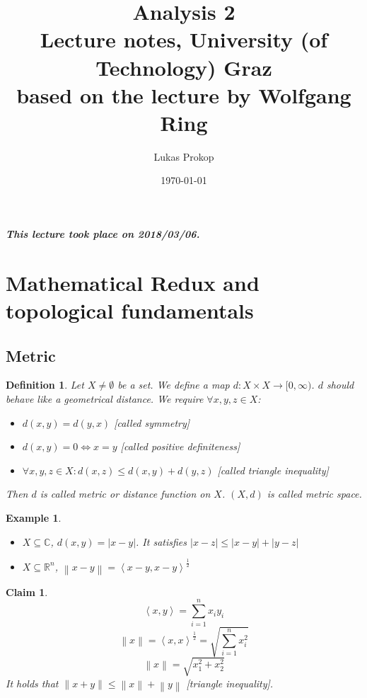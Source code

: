 \documentclass{article}
\title{
  Analysis 2 \\
  \large{Lecture notes, University (of Technology) Graz} \\
  based on the lecture by Wolfgang Ring
}
\date{\today}
\author{Lukas Prokop}
\newtheorem{example}{Example}  \numberwithin{example}{section}
\newtheorem{definition}{Definition}  \numberwithin{definition}{section}
\newtheorem*{claim}{Claim}%
\newcommand{\angel}[1]{\left\langle#1\right\rangle}
\newcommand{\norm}[1]{\left\|#1\right\|}
\newcommand{\card}[1]{\left|#1\right|}
\newcommand{\dateref}[1]{\paragraph{\textit{This lecture took place on #1.}}}
\begin{document}
\maketitle
\tableofcontents

\dateref{2018/03/06}

\section{Mathematical Redux and topological fundamentals}
\subsection{Metric}

\begin{definition}
  Let $X \neq \emptyset$ be a set. We define a map $d: X \times X \to [0,\infty)$.
  $d$ should behave like a geometrical distance. We require $\forall x, y, z \in X$:
  \begin{itemize}
    \item $d(x, y) = d(y, x)$ [called \emph{symmetry}]
    \item $d(x, y) = 0 \iff x = y$ [called \emph{positive definiteness}]
    \item $\forall x,y,z \in X: d(x, z) \leq d(x, y) + d(y, z)$ [called \emph{triangle inequality}]
  \end{itemize}
  Then $d$ is called \emph{metric} or \emph{distance function} on $X$.
  $(X, d)$ is called \emph{metric space}.
\end{definition}

\begin{example}
  \begin{itemize}\hfill{}
    \item $X \subseteq \mathbb C$, $d(x, y) = \card{x - y}$.
          It satisfies $\card{x - z} \leq \card{x - y} + \card{y - z}$
    \item $X \subseteq \mathbb R^n$, $\norm{x - y} = \angel{x - y, x - y}^{\frac12}$
  \end{itemize}
\end{example}

\begin{claim}
  \[ \angel{x, y} = \sum_{i=1}^n x_i y_i \]
  \[ \norm{x} = \angel{x,x}^{\frac12} = \sqrt{\sum_{i=1}^n x_i^2} \]
  \[ \norm{x} = \sqrt{x_1^2 + x_2^2} \]
  It holds that $\norm{x+y} \leq \norm{x} + \norm{y}$ [triangle inequality].
\end{claim}
\end{document}

